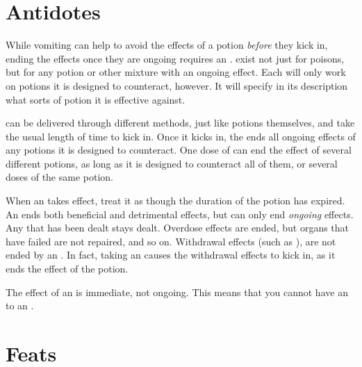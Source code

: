 \section{Antidotes}

While vomiting can help to avoid the effects of a potion \emph{before} they kick in, ending the effects once they are ongoing requires an {\antidote}.
{\antidotes} exist not just for poisons, but for any potion or other mixture with an ongoing effect.
Each {\antidote} will only work on potions it is designed to counteract, however.
It will specify in its description what sorts of potion it is effective against.

{\antidotes} can be delivered through different methods, just like potions themselves, and take the usual length of time to kick in.
Once it kicks in, the {\antidote} ends all ongoing effects of any potions it is designed to counteract.
One dose of {\antidote} can end the effect of several different potions, as long as it is designed to counteract all of them, or several doses of the same potion.

When an {\antidote} takes effect, treat it as though the duration of the potion has expired.
An {\antidote} ends both beneficial and detrimental effects, but can only end \emph{ongoing} effects.
Any {\damage} that has been dealt stays dealt.
Overdose effects are ended, but organs that have failed are not repaired, and so on.
Withdrawal effects (such as ), are not ended by an {\antidote}.
In fact, taking an {\antidote} causes the withdrawal effects to kick in, as it ends the effect of the potion.

The effect of an {\antidote} is immediate, not ongoing.
This means that you cannot have an {\antidote} to an {\antidote}.

\section{Feats}



